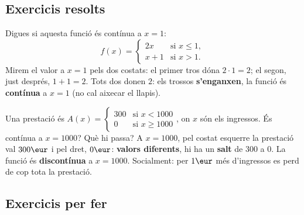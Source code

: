\subsection{Exercicis resolts}

\begin{exresolt}
Digues si aquesta funció és contínua a $x=1$:
\[
f(x)=
\begin{cases}
2x & \text{si } x\le 1,\\[2pt]
x+1 & \text{si } x>1.
\end{cases}
\]
\solucio
Mirem el valor a $x=1$ pels dos costats: el primer tros dóna $2\cdot 1=2$; el segon,
just després, $1+1=2$. Tots dos donen $2$: els trossos \textbf{s'enganxen}, la funció
és \textbf{contínua} a $x=1$ (no cal aixecar el llapis).
\end{exresolt}

\begin{exresolt}
Una prestació és $A(x)=\begin{cases}300 & \text{si } x<\num{1000}\\ 0 & \text{si } x\ge\num{1000}\end{cases}$,
on $x$ són els ingressos. És contínua a $x=\num{1000}$? Què hi passa?
\solucio
A $x=\num{1000}$, pel costat esquerre la prestació val $300\eur$ i pel dret, $0\eur$:
\textbf{valors diferents}, hi ha un \textbf{salt} de $300$ a $0$. La funció és
\textbf{discontínua} a $x=\num{1000}$. Socialment: per $1\eur$ més d'ingressos es perd
de cop tota la prestació.
\end{exresolt}

\subsection{Exercicis per fer}

